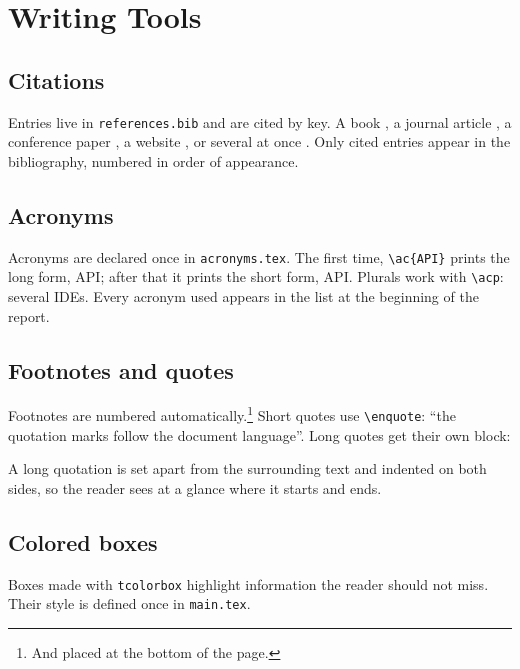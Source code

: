 \chapter{Writing Tools}
\label{chap:writing}

\section{Citations}

Entries live in \texttt{references.bib} and are cited by key. A book
\cite{knuth1984texbook}, a journal article \cite{knuth1984literate}, a
conference paper \cite{vaswani2017attention}, a website \cite{latexworkshop}, or
several at once \cite{lamport1994latex,knuth1984texbook}. Only cited entries
appear in the bibliography, numbered in order of appearance.

\section{Acronyms}

Acronyms are declared once in \texttt{acronyms.tex}. The first time,
\verb|\ac{API}| prints the long form, \ac{API}; after that it prints the
short form, \ac{API}. Plurals work with \verb|\acp|: several \acp{IDE}.
Every acronym used appears in the list at the beginning of the report.

\section{Footnotes and quotes}

Footnotes are numbered automatically.\footnote{And placed at the bottom of
the page.} Short quotes use \verb|\enquote|: \enquote{the quotation marks
follow the document language}. Long quotes get their own block:

\begin{displayquote}
  A long quotation is set apart from the surrounding text and indented on
  both sides, so the reader sees at a glance where it starts and ends.
\end{displayquote}

\section{Colored boxes}

\begin{notebox}
  Boxes made with \texttt{tcolorbox} highlight information the reader should
  not miss. Their style is defined once in \texttt{main.tex}.
\end{notebox}

